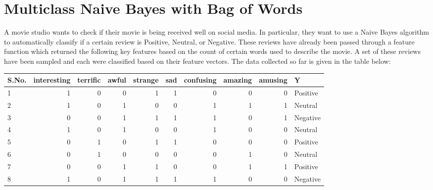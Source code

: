 \documentclass[11pt, letterpaper]{article}
\begin{document}
\newpage
\section{Multiclass Naive Bayes with Bag of Words}

    A movie studio wants to check if their movie is being received well on social media. In particular, they want to use a Naive Bayes algorithm to automatically classify if a certain review is Positive, Neutral, or Negative. These reviews have already been passed through a feature function which returned the following key features based on the count of certain words used to describe the movie. A set of these reviews have been sampled and each were classified based on their feature vectors. The data collected so far is given in the table below:
    
    \begin{table}[h!]
    \centering
    \small
    \begin{tabular}{|l | r | r | r | r | r | r | r | r | l|}

    \hline
    S.No. & interesting & terrific & awful & strange & sad & confusing & amazing & amusing & Y \\ \hline
    1          & 1           & 0         & 0    & 1     & 1       & 0       & 0            & 0      & Positive \\
    2           & 1           & 0         & 1    & 0     & 0       & 1       & 1            & 1      & Neutral\\
    3           & 0           & 0         & 1    & 1     & 1       & 1       & 0            & 1      & Negative\\
    4           & 1           & 0         & 1    & 0     & 0       & 1       & 0            & 0      & Neutral\\
    5           & 0           & 1         & 0    & 1     & 1       & 0       & 0            & 0      & Positive\\
    6           & 0           & 1         & 0    & 0     & 0       & 0       & 1            & 0      & Neutral\\
    7           & 0           & 0         & 1    & 1     & 0       & 0       & 1            & 1      & Positive\\
    8           & 1           & 0         & 1    & 1     & 1       & 1       & 0            & 0      & Negative\\
    \hline
    \end{tabular}
    \end{table}
    
\end{document}
